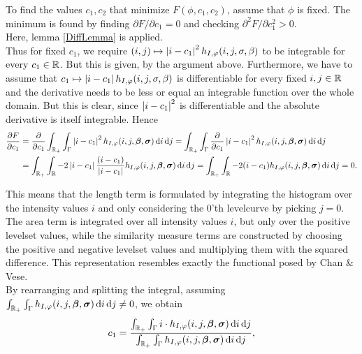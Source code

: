 To find the values $c_1,c_2$ that minimize $F(\phi,c_1,c_2)$, assume that $\phi$ is fixed. The minimum is found by finding $\partial F/\partial c_1 =0$ and checking $\partial^2 F/\partial c_1^2 > 0$. \\
Here, lemma \ref{DiffLemma} is applied.\\
Thus for fixed $c_1$, we require $(i,j)\mapsto \left| {i-c_1} \right|^2h_{I,\varphi}(i,j,\sigma,\beta)$ to be integrable for every $c_1\in\mathbb R$. But this is given, by the argument above. Furthermore, we have to assume that  $c_1 \mapsto \left| {i-c_1} \right|h_{I,\varphi}(i,j,\sigma,\beta)$ is differentiable for every fixed $i,j\in \mathbb R$ and the derivative needs to be less or equal an integrable function over the whole domain. But this is clear, since $\left| {i-c_1} \right|^2$ is differentiable and the absolute derivative is itself integrable. Hence
\begin{equation}
  \begin{split}
    \frac{\partial F}{\partial c_1} &= \frac{\partial }{\partial c_1} \int_{\mathbb R_+}\int_{\Gamma}\left| {i-c_1} \right|^2 h_{I,\varphi}(i,j,\boldsymbol{\beta} ,\boldsymbol{\sigma} ) \,{\rm d} i\,{\rm d} j 
    = \int_{\mathbb R_+}\int_{\Gamma}\frac{\partial }{\partial c_1}\left| {i-c_1} \right|^2 h_{I,\varphi}(i,j,\boldsymbol{\beta} ,\boldsymbol{\sigma} ) \,{\rm d} i\,{\rm d} j \\
    &= \int_{\mathbb R_+} \int_\mathbb R-2\left| {i-c_1} \right|\frac{(i-c_1)}{\left| {i-c_1} \right|} h_{I,\varphi}(i,j,\boldsymbol{\beta} ,\boldsymbol{\sigma} ) \,{\rm d} i\,{\rm d} j 
    = \int_{\mathbb R_+} \int_\mathbb R-2(i-c_1) h_{I,\varphi}(i,j,\boldsymbol{\beta} ,\boldsymbol{\sigma} ) \,{\rm d} i\,{\rm d} j = 0.
  \end{split}
\end{equation}

This means that the length term is formulated by integrating the histogram over the intensity values $i$ and only considering the 0'th levelcurve by picking $j=0$. The area term is integrated over all intensity values $i$, but only over the positive levelset values, while the similarity measure terms are constructed by choosing the positive and negative levelset values and multiplying them with the squared difference. This representation resembles exactly the functional posed by Chan \& Vese.\\

By rearranging and splitting the integral, assuming $\int_{\mathbb R_+}\int_{\Gamma}h_{I,\varphi}(i,j,\boldsymbol{\beta} ,\boldsymbol{\sigma} ) \,{\rm d} i\,{\rm d} j\neq 0$, we obtain
\begin{equation}
  c_1 = \frac{\int_{\mathbb R_+}  \int_{\Gamma}i\cdot h_{I,\varphi}(i,j,\boldsymbol{\beta} ,\boldsymbol{\sigma} ) \,{\rm d} i\,{\rm d} j}{\int_{\mathbb R_+}\int_{\Gamma}h_{I,\varphi}(i,j,\boldsymbol{\beta} ,\boldsymbol{\sigma} ) \,{\rm d} i\,{\rm d} j},
\end{equation}


